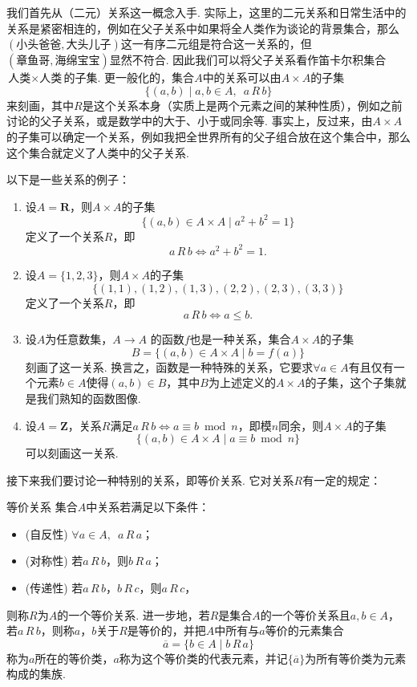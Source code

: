 我们首先从（二元）关系这一概念入手. 实际上，这里的二元关系和日常生活中的关系是紧密相连的，例如在父子关系中如果将全人类作为谈论的背景集合，那么$(\text{小头爸爸}, \text{大头儿子})$这一有序二元组是符合这一关系的，但$(\text{章鱼哥}, \text{海绵宝宝})$显然不符合. 因此我们可以将父子关系看作笛卡尔积集合$\text{人类}\times\text{人类}$的子集. 更一般化的，集合$A$中的关系可以由$A\times A$的子集
\[\{(a,b) \mid a,b\in A, \enspace a\,R\,b\}\]
来刻画，其中$R$是这个关系本身（实质上是两个元素之间的某种性质），例如之前讨论的父子关系，或是数学中的大于、小于或同余等. 事实上，反过来，由$A\times A$的子集可以确定一个关系，例如我把全世界所有的父子组合放在这个集合中，那么这个集合就定义了人类中的父子关系.
\begin{example}{}{}
    以下是一些关系的例子：
    \begin{enumerate}
        \item 设$A=\mathbf{R}$，则$A\times A$的子集
              \[\{(a,b)\in A\times A \mid a^2+b^2=1\}\]
              定义了一个关系$R$，即
              \[a\,R\,b \iff a^2+b^2=1.\]

        \item 设$A=\{1,2,3\}$，则$A\times A$的子集
              \[\{(1,1),(1,2),(1,3),(2,2),(2,3),(3,3)\}\]
              定义了一个关系$R$，即
              \[a\,R\,b \iff a\leqslant b.\]

        \item 设$A$为任意数集，$A\to A$ 的函数$f$也是一种关系，集合$A\times A$的子集
              \[B=\{(a,b)\in A\times A \mid b=f(a)\}\]
              刻画了这一关系. 换言之，函数是一种特殊的关系，它要求$\forall a\in A$有且仅有一个元素$b\in A$使得$(a,b)\in B$，其中$B$为上述定义的$A\times A$的子集，这个子集就是我们熟知的函数图像.

        \item 设$A=\mathbf{Z}$，关系$R$满足$a\,R\,b\iff a\equiv b \bmod n$，即模$n$同余，则$A\times A$的子集
              \[\{(a,b)\in A\times A \mid a\equiv b \bmod n\}\]
              可以刻画这一关系.
    \end{enumerate}
\end{example}

接下来我们要讨论一种特别的关系，即等价关系. 它对关系$R$有一定的规定：
\begin{definition}{}{等价关系}
    集合$A$中关系若满足以下条件：
    \begin{itemize}
        \item (自反性) $\forall a\in A, \enspace a\,R\,a$；

        \item (对称性) 若$a\,R\,b$，则$b\,R\,a$；

        \item (传递性) 若$a\,R\,b$，$b\,R\,c$，则$a\,R\,c$，
    \end{itemize}
    则称$R$为$A$的一个等价关系. 进一步地，若$R$是集合$A$的一个等价关系且$a,b\in A$，若$a\,R\,b$，则称$a$，$b$关于$R$是等价的，并把$A$中所有与$a$等价的元素集合
    \[\overline{a}=\{b\in A \mid b\,R\,a\}\]
    称为$a$所在的等价类，$a$称为这个等价类的代表元素，并记$\{\overline{a}\}$为所有等价类为元素构成的集族.
\end{definition}


